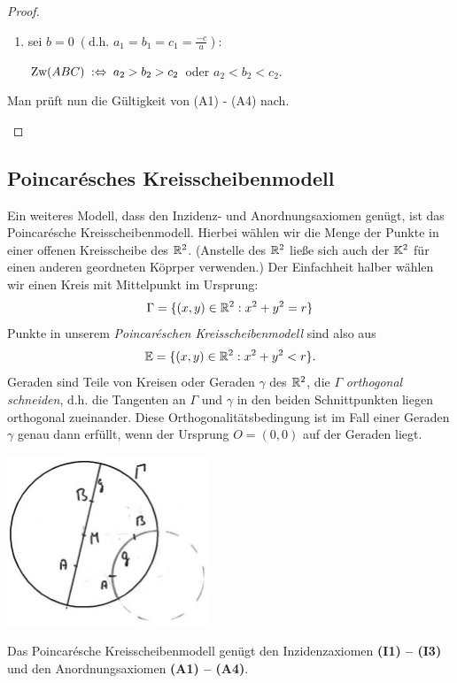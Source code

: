 \begin{proof}
\begin{itemize}
\begin{enumerate}
                \item sei $b = 0\; (\mbox{d.h. } a_1 = b_1 = c_1 = \frac{-c}{a}):$

                    $\operatorname{Zw}(ABC)\;: \Leftrightarrow\; a_2 > b_2 > c_2$ oder $a_2 < b_2 < c_2$.
            \end{enumerate}

            Man prüft nun die Gültigkeit von (A1) - (A4) nach. %
    \end{itemize}
\end{proof}

\subsection*{Poincarésches Kreisscheibenmodell}

Ein weiteres Modell, dass den Inzidenz- und Anordnungsaxiomen genügt, ist das Poincarésche
Kreisscheibenmodell. Hierbei wählen wir die Menge der Punkte in einer offenen Kreisscheibe des
$\mathbb R^2$. (Anstelle des $\mathbb R^2$ ließe sich auch der $\mathbb K^2$ für einen anderen geordneten Köprper
verwenden.) Der Einfachheit halber wählen wir einen Kreis mit Mittelpunkt im Ursprung:
$$
    \Gamma = \{ (x,y) \in \mathbb R^2 :  x^2 + y^2 = r \}
$$
Punkte in unserem {\em  Poincaréschen Kreisscheibenmodell} sind also aus
$$
    \mathbb E = \{ (x,y) \in \mathbb R^2 :  x^2 + y^2 < r \}.
$$
Geraden sind Teile von Kreisen oder Geraden $\gamma$ des $\mathbb R^2$, die $\Gamma$ {\em orthogonal
schneiden}, d.h. die Tangenten an $\Gamma$ und $\gamma$ in den beiden Schnittpunkten liegen
orthogonal zueinander. Diese Orthogonalitätsbedingung ist im Fall einer Geraden $\gamma$ genau dann
erfüllt, wenn der Ursprung $O = (0,0)$ auf der Geraden liegt.

\centerline{\includegraphics[width=6cm]{BILDER/4-2-04b-Geraden.jpg}}

\begin{thm} \label{thm:PoincareKreisscheibe}
    Das Poincarésche Kreisscheibenmodell genügt den Inzidenzaxiomen {\bf (I1) -- (I3)} und den
    Anordnungsaxiomen {\bf (A1) -- (A4)}.
\end{thm}

